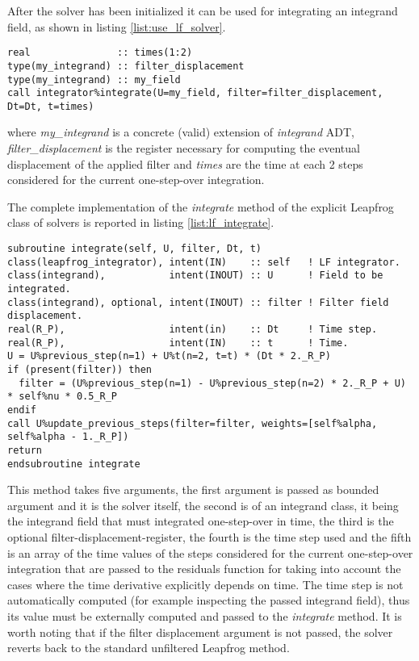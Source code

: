 \documentclass[pdftex,preprint,3p,times,numbers]{elsarticle}
\begin{document}
After the solver has been initialized it can be used for integrating an integrand field, as shown in listing \ref{list:use_lf_solver}.

\begin{lstlisting}[firstnumber=1,style=code,caption={example of usage of a Leapfrog integrator},label={list:use_lf_solver}]
real               :: times(1:2)
type(my_integrand) :: filter_displacement
type(my_integrand) :: my_field
call integrator%integrate(U=my_field, filter=filter_displacement, Dt=Dt, t=times)
\end{lstlisting}
where \emph{my\_integrand} is a concrete (valid) extension of \emph{integrand} ADT, \emph{filter\_displacement} is the register necessary for computing the eventual displacement of the applied filter and \emph{times} are the time at each 2 steps considered for the current one-step-over integration.

The complete implementation of the \emph{integrate} method of the explicit Leapfrog class of solvers is reported in listing \ref{list:lf_integrate}.

\begin{lstlisting}[firstnumber=1,style=code,caption={implementation of the \emph{integrate} method of explicit Leapfrog class},label={list:lf_integrate}]
subroutine integrate(self, U, filter, Dt, t)
class(leapfrog_integrator), intent(IN)    :: self   ! LF integrator.
class(integrand),           intent(INOUT) :: U      ! Field to be integrated.
class(integrand), optional, intent(INOUT) :: filter ! Filter field displacement.
real(R_P),                  intent(in)    :: Dt     ! Time step.
real(R_P),                  intent(IN)    :: t      ! Time.
U = U%previous_step(n=1) + U%t(n=2, t=t) * (Dt * 2._R_P)
if (present(filter)) then
  filter = (U%previous_step(n=1) - U%previous_step(n=2) * 2._R_P + U) * self%nu * 0.5_R_P
endif
call U%update_previous_steps(filter=filter, weights=[self%alpha, self%alpha - 1._R_P])
return
endsubroutine integrate
\end{lstlisting}

This method takes five arguments, the first argument is passed as bounded argument and it is the solver itself, the second is of an integrand class, it being the integrand field that must integrated one-step-over in time, the third is the optional filter-displacement-register, the fourth is the time step used and the fifth is an array of the time values of the steps considered for the current one-step-over integration that are passed to the residuals function for taking into account the cases where the time derivative explicitly depends on time. The time step is not automatically computed (for example inspecting the passed integrand field), thus its value must be externally computed and passed to the \emph{integrate} method. It is worth noting that if the filter displacement argument is not passed, the solver reverts back to the standard unfiltered Leapfrog method.
\end{document}
